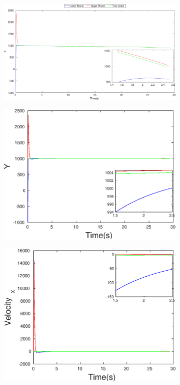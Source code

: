\begin{figure}[h]
\begin{subfigure}{.5\linewidth}
\centering
\includegraphics[width=\linewidth]{figures/HInf/s3caHInfX}
\end{subfigure}
\begin{subfigure}{.5\linewidth}
\centering
\includegraphics[width=\linewidth]{figures/HInf/s3caHInfY}
\end{subfigure}
\begin{subfigure}{.5\linewidth}
\centering
\includegraphics[width=.9\linewidth]{figures/HInf/s3caHInfVelocity_x}

\end{subfigure}
\end{figure}
